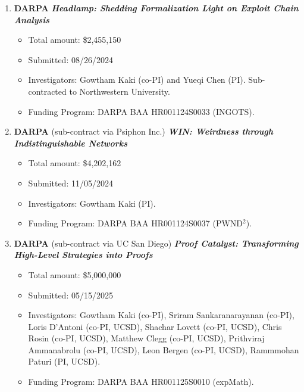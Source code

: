 \documentclass{article}
\begin{document}
\begin{enumerate}
\item {\bf DARPA} {\bf\emph{Headlamp: Shedding Formalization Light on Exploit Chain Analysis}} 
  \begin{itemize}
  \item
    Total amount: \$2,455,150 
  \item  
    Submitted: 08/26/2024 
  \item 
    Investigators: Gowtham Kaki (co-PI) and Yueqi Chen (PI). Sub-contracted
    to Northwestern University. 
  \item 
      Funding Program: DARPA BAA HR001124S0033 (INGOTS).  
  \end{itemize}

\item {\bf DARPA} (sub-contract via Psiphon Inc.) {\bf\emph{WIN: Weirdness through Indistinguishable Networks}} 
  \begin{itemize}
  \item
    Total amount: \$4,202,162
  \item  
    Submitted: 11/05/2024 
  \item 
    Investigators: Gowtham Kaki (PI). 
  \item 
      Funding Program:  DARPA BAA HR001124S0037 (PWND$^2$).  
  \end{itemize}

\item {\bf DARPA} (sub-contract via UC San Diego) {\bf\emph{Proof Catalyst: Transforming High-Level Strategies into Proofs}} 
  \begin{itemize}
  \item
    Total amount: \$5,000,000
  \item  
    Submitted: 05/15/2025 
  \item 
    Investigators: Gowtham Kaki (co-PI), Sriram Sankaranarayanan (co-PI),
    Loris D'Antoni (co-PI, UCSD), Shachar Lovett (co-PI, UCSD), Chris Rosin
    (co-PI, UCSD), Matthew Clegg (co-PI, UCSD), Prithviraj Ammanabrolu
    (co-PI, UCSD), Leon Bergen (co-PI, UCSD), Rammmohan Paturi (PI, UCSD). 
  \item 
      Funding Program:  DARPA BAA HR001125S0010 (expMath).  
  \end{itemize}

\end{enumerate}

\end{document}
